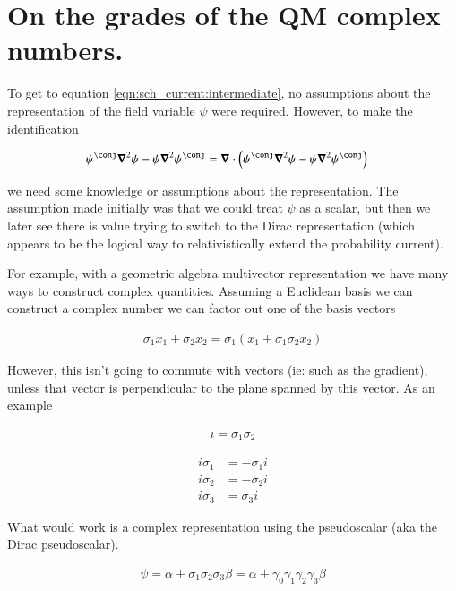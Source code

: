 \section{On the grades of the QM complex numbers. }

To get to equation \ref{eqn:sch_current:intermediate}, no assumptions about the representation of the field variable $\psi$ were
required.  However, to make the identification

\begin{align*}
\psi^\conj \spacegrad^2 \psi - \psi \spacegrad^2 \psi^\conj 
&= \spacegrad \cdot \left( \psi^\conj \spacegrad^2 \psi - \psi \spacegrad^2 \psi^\conj \right)
\end{align*}

we need some knowledge or assumptions about the representation.  The assumption made initially was that we could treat
$\psi$ as a scalar, but then we later see there is value trying to switch to the Dirac representation (which appears
to be the logical way to relativistically extend the probability current).

For example, with a geometric algebra multivector representation we have many ways to construct complex quantities.  Assuming a
Euclidean basis we can construct a complex number we can factor out one of the basis vectors

\begin{align*}
\sigma_1 x_1 + \sigma_2 x_2 = \sigma_1 ( x_1 + \sigma_1 \sigma_2 x_2 )
\end{align*}

However, this isn't going to commute with vectors (ie: such as the gradient), unless that vector is perpendicular to the
plane spanned by this vector.  As an example

\begin{align*}
i = \sigma_1 \sigma_2
\end{align*}

\begin{align*}
i \sigma_1 &= -\sigma_1 i \\
i \sigma_2 &= -\sigma_2 i \\
i \sigma_3 &=  \sigma_3 i
\end{align*}

What would work is a complex representation using the  pseudoscalar (aka the Dirac pseudoscalar).

\begin{align*}
\psi = \alpha + \sigma_1 \sigma_2 \sigma_3 \beta = \alpha + \gamma_0 \gamma_1 \gamma_2 \gamma_3 \beta 
\end{align*}
